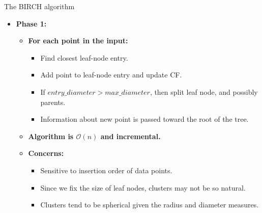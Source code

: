 \begin{frame}{The BIRCH algorithm}
	\begin{itemize}
		\item \textbf{Phase 1:}
		\begin{itemize}
			\item \textbf{For each point in the input:}
			\begin{itemize}
				\item Find closest leaf-node entry.
				\item Add point to leaf-node entry and update CF.
				\item If $entry\_diameter > max\_diameter$, then split leaf 
				node, and possibly parents.
				\item Information about new point is passed toward the root of 
				the tree.
			\end{itemize}
			\item \textbf{Algorithm is $\mathcal{O}(n)$ and incremental.}
			\item \textbf{Concerns:}
			\begin{itemize}
				\item Sensitive to insertion order of data points.
				\item Since we fix the size of leaf nodes, clusters may not be 
				so natural.
				\item Clusters tend to be spherical given the radius and 
				diameter measures.
			\end{itemize}
		\end{itemize}
	\end{itemize}
\end{frame}

